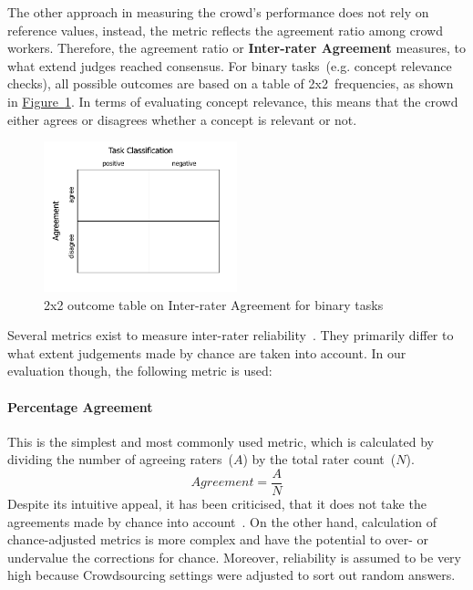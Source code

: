 The other approach in measuring the crowd's performance does not rely on reference values, instead, the metric reflects the agreement ratio among crowd workers. Therefore, the agreement ratio or \textbf{Inter-rater Agreement} measures, to what extend judges reached consensus. For binary tasks~(e.g. concept relevance checks), all possible outcomes are based on a table of 2x2~frequencies, as shown in \hyperref[fig:2x2_inter_rater_table]{Figure~\ref*{fig:2x2_inter_rater_table}}. In terms of evaluating concept relevance, this means that the crowd either agrees or disagrees whether a concept is relevant or not. 
\begin{figure}
	 \centering
	 \includegraphics[width=0.5\textwidth]{drawio/Inter_Rater_Outcome_Table}
	 \caption{2x2 outcome table on Inter-rater Agreement for binary tasks}\label{fig:2x2_inter_rater_table}
\end{figure}

Several metrics exist to measure inter-rater reliability~\cite{zhao2013}. They primarily differ to what extent judgements made by chance are taken into account. In our evaluation though, the following metric is used:
\paragraph{Percentage Agreement}
This is the simplest and most commonly used metric, which is calculated by dividing the number of agreeing raters~($A$) by the total rater count~($N$).
\[ Agreement = \frac{A}{N} \]
Despite its intuitive appeal, it has been criticised, that it does not take the agreements made by chance into account~\cite{hunt1986}. On the other hand, calculation of chance-adjusted metrics is more complex and have the potential to over- or undervalue the corrections for chance.  
Moreover, reliability is assumed to be very high because Crowdsourcing settings were adjusted to sort out random answers.
